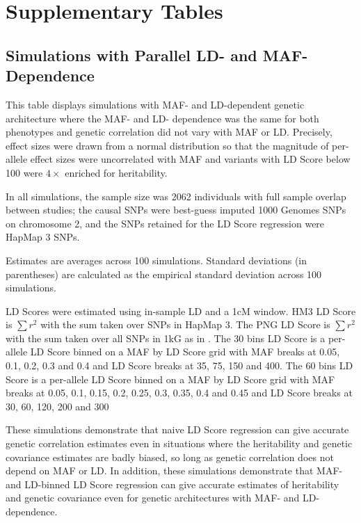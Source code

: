 \documentclass[11pt]{article}
\numberwithin{equation}{section}
\numberwithin{definition}{section}
\numberwithin{thm}{section}
\numberwithin{lemma}{section}
\numberwithin{prop}{section}
\numberwithin{cor}{section}
\numberwithin{hyp}{section}
\begin{document}
\section{Supplementary Tables}

\subsection{Simulations with Parallel LD- and MAF-Dependence}
\label{parallel}

This table displays simulations with MAF- and LD-dependent genetic architecture where the MAF- and LD- dependence was the same for both phenotypes and genetic correlation did not vary with MAF or LD. Precisely, effect sizes were drawn from a normal distribution so that the magnitude of per-allele effect sizes were uncorrelated with MAF and variants with LD Score below 100 were $4\times$ enriched for heritability.

In all simulations, the sample size was 2062 individuals with full sample overlap between studies; the causal SNPs were best-guess imputed 1000 Genomes SNPs on chromosome 2, and the SNPs retained for the LD Score regression were HapMap 3 SNPs. 

Estimates are averages across 100 simulations. Standard deviations (in parentheses) are calculated as the empirical standard deviation across 100 simulations.

LD Scores were estimated using in-sample LD and a 1cM window. 
HM3 LD Score is $\sum r^2$ with the sum taken over SNPs in HapMap 3. 
The PNG LD Score is $\sum r^2$ with the sum taken over all SNPs in 1kG as in \cite{buliksullivan2014}. The 30 bins LD Score is a per-allele LD Score binned on a MAF by LD Score grid with MAF breaks at 0.05, 0.1, 0.2, 0.3 and 0.4 and LD Score breaks at 35, 75, 150 and 400. The 60 bins LD Score is a per-allele LD Score binned on a MAF by LD Score grid with MAF breaks at 0.05, 0.1, 0.15, 0.2, 0.25, 0.3, 0.35, 0.4 and 0.45 and LD Score breaks at 30, 60, 120, 200 and 300

These simulations demonstrate that naive LD Score regression can give accurate genetic correlation estimates even in situations where the heritability and genetic covariance estimates are badly biased, so long as genetic correlation does not depend on MAF or LD. In addition, these simulations demonstrate that MAF- and LD-binned LD Score regression can give accurate estimates of heritability and genetic covariance even for genetic architectures with MAF- and LD-dependence.
\end{document}
